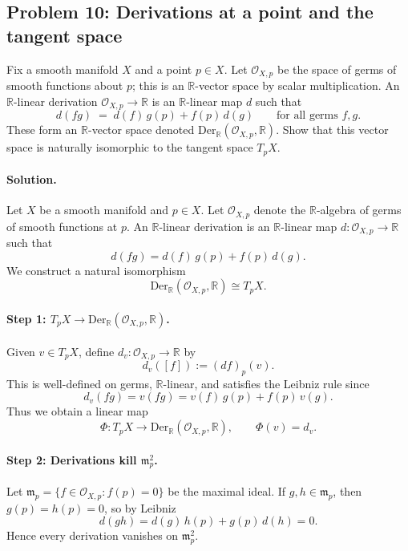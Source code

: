 \documentclass[12pt,a4paper]{article}
\theoremstyle{plain}
\theoremstyle{definition}      %
\begin{document}
\subsection*{Problem 10: Derivations at a point and the tangent space}

\noindent Fix a smooth manifold $X$ and a point $p\in X$. Let $\mathcal{O}_{X,p}$ be the space of germs
of smooth functions about $p$; this is an $\mathbb{R}$-vector space by scalar multiplication.
An $\mathbb{R}$-linear derivation $\mathcal{O}_{X,p}\to\mathbb{R}$ is an $\mathbb{R}$-linear map $d$ such that
\[
d(fg)\;=\; d(f)\,g(p) + f(p)\,d(g)
\qquad\text{for all germs } f,g.
\]
These form an $\mathbb{R}$-vector space denoted $\mathrm{Der}_{\mathbb{R}}(\mathcal{O}_{X,p},\mathbb{R})$.
Show that this vector space is naturally isomorphic to the tangent space $T_pX$.




\paragraph{\textbf{Solution.}}
Let $X$ be a smooth manifold and $p\in X$. Let $\mathcal{O}_{X,p}$ denote the $\mathbb{R}$-algebra of germs
of smooth functions at $p$. An $\mathbb{R}$-linear derivation is an $\mathbb{R}$-linear map
$d:\mathcal{O}_{X,p}\to \mathbb{R}$ such that
\[
d(fg)=d(f)\,g(p)+f(p)\,d(g).
\]
We construct a natural isomorphism
\[
\mathrm{Der}_{\mathbb{R}}(\mathcal{O}_{X,p},\mathbb{R}) \cong T_pX.
\]

\paragraph{Step 1: $T_pX \to \mathrm{Der}_{\mathbb{R}}(\mathcal{O}_{X,p},\mathbb{R})$.}
Given $v\in T_pX$, define $d_v:\mathcal{O}_{X,p}\to \mathbb{R}$ by
\[
d_v([f]) := (df)_p(v).
\]
This is well-defined on germs, $\mathbb{R}$-linear, and satisfies the Leibniz rule since
\[
d_v(fg) = v(fg) = v(f)\,g(p) + f(p)\,v(g).
\]
Thus we obtain a linear map
\[
\Phi:T_pX\to \mathrm{Der}_{\mathbb{R}}(\mathcal{O}_{X,p},\mathbb{R}),\qquad \Phi(v)=d_v.
\]

\paragraph{Step 2: Derivations kill $\mathfrak{m}_p^2$.}
Let $\mathfrak{m}_p=\{f\in \mathcal{O}_{X,p}: f(p)=0\}$ be the maximal ideal.
If $g,h\in \mathfrak{m}_p$, then $g(p)=h(p)=0$, so by Leibniz
\[
d(gh)=d(g)\,h(p)+g(p)\,d(h)=0.
\]
Hence every derivation vanishes on $\mathfrak{m}_p^2$.
\end{document}
